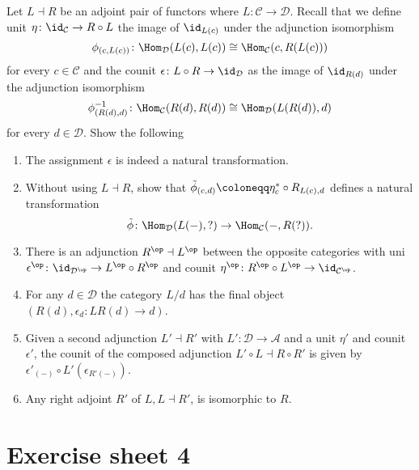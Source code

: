 Let $ L \dashv R $ be an adjoint pair of functors where $ L \colon \mathcal{ C } \to \mathcal{ D } $.
Recall that we define unit $ \eta \colon \id_{ \mathcal{ C } } \to R \circ L $ the image of $ \id_{ L ( c ) } $ under the adjunction isomorphism
\[
    \phi_{ ( c , L ( c ) ) } \colon \Hom_{\mathcal{ D } } ( L ( c ) , L ( c ) ) \cong \Hom_{ \mathcal{ C } }( c, R ( L ( c ) ) )
\]
for every $ c \in \mathcal{ C } $ and the counit $ \epsilon \colon L \circ R \to \id_{ \mathcal D } $ as the image of $ \id_{ R ( d ) } $ under the adjunction isomorphism
\[
    \phi^{ -1 }_{ ( R ( d ) , d ) } \colon \Hom_{ \mathcal{ C } } ( R ( d ) , R ( d ) ) \cong  \Hom_{ \mathcal{ D } }( L ( R ( d ) ) , d ) 
\]
for every $ d \in \mathcal{ D } $. 
Show the following 
\begin{enumerate}
    \item 
    The assignment $ \epsilon $ is indeed a natural transformation.

    \item 
    Without using $ L \dashv R $, show that $ \Tilde{ \phi }_{ ( c ,d ) } \coloneqq \eta_c^* \circ R_{ L ( c ) , d } $ defines a natural transformation
    \[
        \Tilde{ \phi } \colon \Hom_{ \mathcal{ D } }( L ( - ) , ?  ) \to \Hom_{ \mathcal{ C } } ( - , R ( ? ) ). 
    \]

    \item 
    There is an adjunction $ R^{ \op } \dashv L^{ \op } $ between the opposite categories with uni $ \epsilon^{ \op } \colon \id_{ \mathcal{ D }^{ \op } } \to L^{ \op } \circ R^{ \op } $ and counit $ \eta^{ \op } \colon R^{ \op } \circ L^{ \op } \to \id_{ \mathcal{ C  }^{\op} } $.

    \item 
    For any $ d \in \mathcal{ D } $ the category $ L / d $ has the final object $ ( R ( d ) , \epsilon_d \colon L R ( d ) \to d ) $.

    \item 
    Given a second adjunction $ L' \dashv R' $ with $ L' \colon \mathcal{ D} \to \mathcal{ A } $ and a unit $ \eta' $ and counit $ \epsilon' $, the counit of the composed adjunction $ L' \circ L \dashv R  \circ R' $ is given by $ \epsilon'_{ ( - ) } \circ L' ( \epsilon_{ R' ( - ) } ) $.

    \item 
    Any right adjoint $ R' $ of $ L , L \dashv R' $, is isomorphic to $ R $.
\end{enumerate}

\section{Exercise sheet 4}

